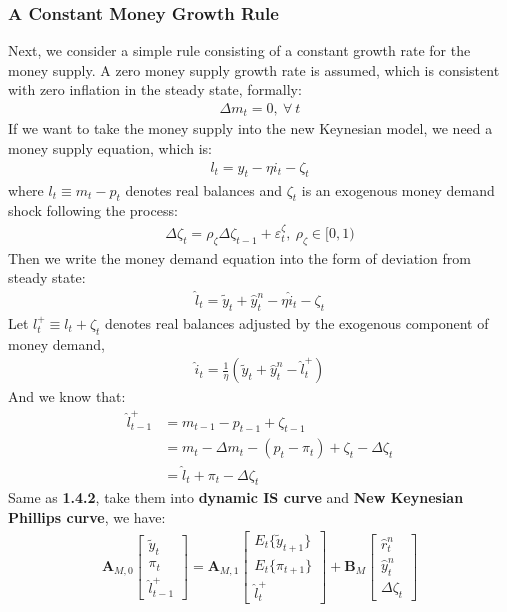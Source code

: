 \documentclass{article}
\numberwithin{equation}{section}
\begin{document}
\subsubsection{A Constant Money Growth Rule}
Next, we consider a simple rule consisting of a constant growth rate for the money supply. A zero money supply growth rate is assumed, which is consistent with zero inflation in the steady state, formally:
	\begin{align*}
		\Delta m_t = 0,\ \forall\ t
	\end{align*}
If we want to take the money supply into the new Keynesian model, we need a money supply equation, which is:
	\begin{align*}
		l_t = y_t - \eta i_t - \zeta_t
	\end{align*}
where $l_t \equiv m_t - p_t$ denotes real balances and $\zeta_t$ is an exogenous money demand shock following the process:
	\begin{align*}
		\Delta \zeta_t = \rho_\zeta \Delta \zeta_{t-1} + \varepsilon^{\zeta}_t,\ \rho_\zeta \in [0, 1)
	\end{align*}
Then we write the money demand equation into the form of deviation from steady state:
	\begin{align*}
		\hat{l}_t = \tilde{y}_t + \hat{y}^n_t - \eta \hat{i}_t - \zeta_t
	\end{align*}
Let $l^+_t \equiv l_t + \zeta_t$ denotes real balances adjusted by the exogenous component of money demand,
	\begin{align*}
		\hat{i}_t = \frac{1}{\eta}(\tilde{y}_t + \hat{y}^n_t - \hat{l}^+_t)
	\end{align*}
And we know that:
	\begin{align*}
		\hat{l}^+_{t-1} &= m_{t-1} - p_{t-1} + \zeta_{t-1}\\
		&= m_t - \Delta m_t - (p_t - \pi_t) + \zeta_t - \Delta \zeta_t\\
		&= \hat{l}_t + \pi_t - \Delta \zeta_t
	\end{align*} 
Same as \textbf{1.4.2}, take them into \textbf{dynamic IS curve} and \textbf{New Keynesian Phillips curve}, we have:
	\begin{align}
		\textbf{A}_{M,0}\begin{bmatrix} 
							\tilde{y}_t\\
							\pi_t\\
							\hat{l}^+_{t-1}
						\end{bmatrix} = 
		\textbf{A}_{M,1}\begin{bmatrix}
							E_t\{\tilde{y}_{t+1}\}\\
							E_t\{\pi_{t+1}\}\\
							\hat{l}^+_t
						\end{bmatrix} +
		\textbf{B}_{M}  \begin{bmatrix}
							\hat{r}^n_t\\
							\hat{y}^n_t\\
							\Delta \zeta_t	
						\end{bmatrix} \label{1.4.2-eqs}
	\end{align}
\end{document}
